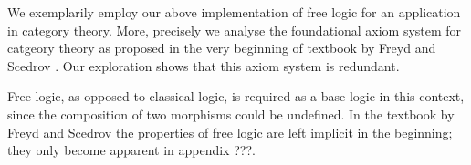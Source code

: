 %
\begin{isabellebody}%
%
%
\isadelimtheory
%
\endisadelimtheory
%
\isatagtheory
%
\endisatagtheory
{\isafoldtheory}%
%
\isadelimtheory
%
\endisadelimtheory
%
\isamarkuptrue%
%
\begin{isamarkuptext}%
We exemplarily employ our above implementation of free logic for an application in
category theory. More, precisely we analyse the foundational axiom system 
for catgeory theory as proposed in the very beginning of textbook by Freyd and 
Scedrov \cite{FreydScedrov90}. Our exploration shows that this axiom system is redundant.

Free logic, as opposed to classical logic, is required as a base logic in this context, since the 
composition of two morphisms could be undefined. In the textbook by Freyd and 
Scedrov the properties of free logic are left implicit in the beginning; they only become 
apparent in appendix ???.  


\end{isamarkuptext}
\end{isabellebody}
